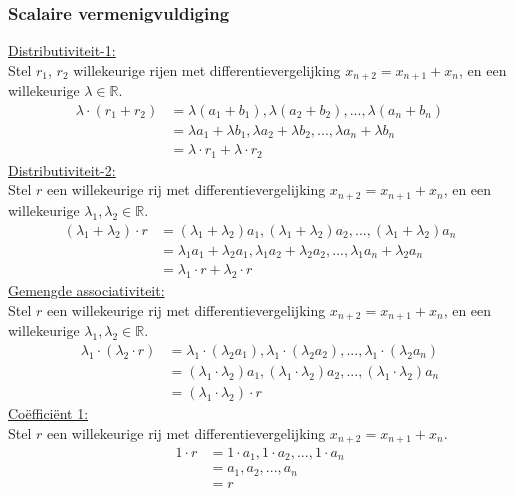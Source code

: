 \documentclass[lineaire_algebra_oplossingen.tex]{subfiles}
\begin{document}
\subsubsection*{Scalaire vermenigvuldiging}
\underline{Distributiviteit-1:}\\
Stel $r_1$, $r_2$ willekeurige rijen met differentievergelijking $x_{n + 2} = x_{n + 1} + x_n$, en een willekeurige $\lambda \in \mathbb{R}$.
\begin{align*}
    \lambda \cdot(r_1 + r_2) &= \lambda (a_1 + b_1), \lambda (a_2 + b_2), ..., \lambda (a_n + b_n)\\
    &= \lambda a_1 + \lambda b_1, \lambda a_2 + \lambda b_2, ..., \lambda a_n + \lambda b_n\\
    &= \lambda \cdot r_1 + \lambda \cdot r_2
\end{align*}
\underline{Distributiviteit-2:}\\
Stel $r$ een willekeurige rij met differentievergelijking $x_{n + 2} = x_{n + 1} + x_n$, en een willekeurige $\lambda_1 , \lambda_2 \in \mathbb{R}$.
\begin{align*}
    (\lambda_1 + \lambda_2) \cdot r &= (\lambda_1 + \lambda_2) a_1, (\lambda_1 + \lambda_2) a_2, ..., (\lambda_1 + \lambda_2) a_n\\
    &= \lambda_1 a_1 + \lambda_2 a_1, \lambda_1 a_2 + \lambda_2 a_2, ..., \lambda_1 a_n + \lambda_2 a_n\\
    &= \lambda_1 \cdot r + \lambda_2 \cdot r
\end{align*}
\underline{Gemengde associativiteit:}\\
Stel $r$ een willekeurige rij met differentievergelijking $x_{n + 2} = x_{n + 1} + x_n$, en een willekeurige $\lambda_1 , \lambda_2 \in \mathbb{R}$.
\begin{align*}
    \lambda_1 \cdot (\lambda_2 \cdot r) &= \lambda_1 \cdot (\lambda_2 a_1), \lambda_1 \cdot (\lambda_2 a_2), ..., \lambda_1 \cdot (\lambda_2 a_n)\\
    &= (\lambda_1 \cdot \lambda_2) a_1, (\lambda_1 \cdot \lambda_2) a_2, ..., (\lambda_1 \cdot \lambda_2) a_n\\
    &= (\lambda_1 \cdot \lambda_2) \cdot r
\end{align*}
\underline{Co\"effici\"ent 1:}\\
Stel $r$ een willekeurige rij met differentievergelijking $x_{n + 2} = x_{n + 1} + x_n$.
\begin{align*}
     1 \cdot r &= 1 \cdot a_1, 1 \cdot a_2, ..., 1 \cdot a_n\\
     &= a_1, a_2, ..., a_n\\
     &= r
\end{align*}
\end{document}
